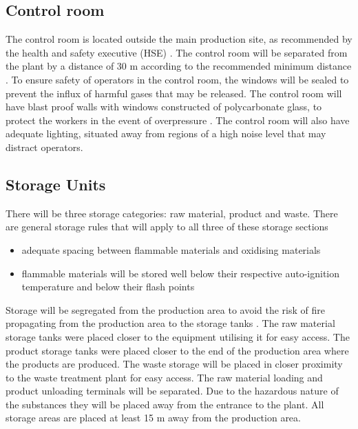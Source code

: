 \subsection{Control room}

The control room is located outside the main production site, as recommended by the health and safety executive (HSE) \cite{health_and_safety_executive_control_nodate}. The control room will be separated from the plant by a distance of 30 m according to the recommended minimum distance \cite{mannan_lees_2012}. To ensure safety of operators in the control room, the windows will be sealed to prevent the influx of harmful gases that may be released. The control room will have blast proof walls with windows constructed of polycarbonate glass, to protect the workers in the event of overpressure \cite{health_and_safety_executive_control_nodate}. The control room will also have adequate lighting, situated away from regions of a high noise level that may distract operators.

\subsection{Storage Units}

There will be three storage categories: raw material, product and waste. There are general storage rules that will apply to all three of these storage sections 

\begin{itemize}
    \item adequate spacing between flammable materials and oxidising materials 
    \item flammable materials will be stored well below their respective auto-ignition temperature and below their flash points
\end{itemize}

Storage will be segregated from the production area to avoid the risk of fire propagating from the production area to the storage tanks \cite{mannan_lees_2012}. The raw material storage tanks were placed closer to the equipment utilising it for easy access. The product storage tanks were placed closer to the end of the production area where the products are produced. The waste storage will be placed in closer proximity to the waste treatment plant for easy access. The raw material loading and product unloading terminals will be separated. Due to the hazardous nature of the substances they will be placed away from the entrance to the plant. All storage areas are placed at least 15 m away from the production area. 

